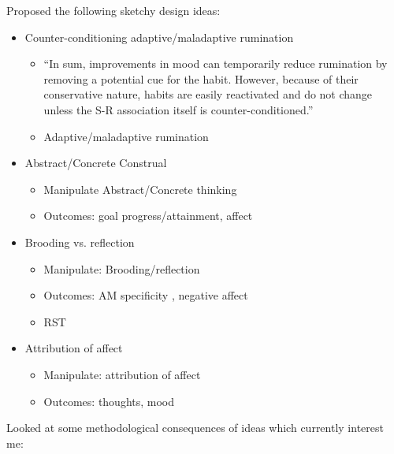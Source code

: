 \documentclass[british]{article}
\begin{document}
Proposed the following sketchy design ideas:

\begin{itemize}
  \item Counter-conditioning adaptive/maladaptive rumination
  \begin{itemize}
    \item \enquote{In sum, improvements in mood can temporarily
    reduce rumination by removing a potential cue for the habit.
    However, because of their conservative nature, habits are easily
    reactivated and do not change unless the S-R association itself is
    counter-conditioned.} \parencite{watkins_habitgoal_2014}
    \item Adaptive/maladaptive rumination \parencite{joormann_adadptive_2006}
  \end{itemize}

  \item Abstract/Concrete Construal
  \begin{itemize}
    \item Manipulate Abstract/Concrete thinking \parencite{watkins_constructive_2008}
    \item Outcomes: goal progress/attainment, affect
  \end{itemize}

  \item Brooding vs. reflection
  \begin{itemize}
    \item Manipulate: Brooding/reflection \parencite{moberly_ruminative_2008}
    \item Outcomes: AM specificity \parencite{debeer_associations_2009},
    negative affect \parencite{moberly_ruminative_2008}
    \item RST \parencite{nolen-hoeksema_responses_1991}
  \end{itemize}

  \item Attribution of affect
  \begin{itemize}
    \item Manipulate: attribution of affect \parencite{clore_how_2007}
    \item Outcomes: thoughts, mood
  \end{itemize}
\end{itemize}

Looked at some methodological consequences of ideas which currently interest me:
\end{document}
